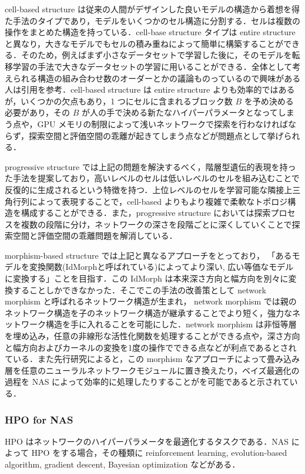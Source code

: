 \documentclass[twocolumn]{ujarticle}   %
\begin{document}
	 cell-based structure は従来の人間がデザインした良いモデルの構造から着想を得た手法のタイプであり，モデルをいくつかのセル構造に分割する．セルは複数の操作をまとめた構造を持っている．cell-base structure タイプは entire structure と異なり，大きなモデルでもセルの積み重ねによって簡単に構築することができる．そのため，例えばまず小さなデータセットで学習した後に，そのモデルを転移学習の手法で大きなデータセットの学習に用いることができる．全体として考えられる構造の組み合わせ数のオーダーとかの議論ものっているので興味がある人は引用を参考．cell-based structure は entire structure よりも効率的ではあるが，いくつかの欠点もあり，1 つにセルに含まれるブロック数 $B$ を予め決める必要があり，その $B$ が人の手で決める新たなハイパーパラメータとなってしまう点や，GPU メモリの制限によって浅いネットワークで探索を行わなければならず，探索空間と評価空間の乖離が起きてしまう点などが問題点として挙げられる．

	 progressive structure では上記の問題を解決するべく，階層型遺伝的表現を持った手法を提案しており，高いレベルのセルは低いレベルのセルを組み込むことで反復的に生成されるという特徴を持つ．上位レベルのセルを学習可能な隣接上三角行列によって表現することで，cell-based よりもより複雑で柔軟なトポロジ構造を構成することができる．また，progressive structure においては探索プロセスを複数の段階に分け，ネットワークの深さを段階ごとに深くしていくことで探索空間と評価空間の乖離問題を解消している．

	 morphism-based structure では上記と異なるアプローチをとっており， 「あるモデルを変換関数(IdMorphと呼ばれている)によってより深い, 広い等価なモデルに変換する」ことを目指す．この IdMorph は本来深さ方向と幅方向を別々に変換することしかできなかった．そこでこの手法の改善策として network morphism と呼ばれるネットワーク構造が生まれ， network morphism では親のネットワーク構造を子のネットワーク構造が継承することでより短く，強力なネットワーク構造を手に入れることを可能にした．network morphism は非恒等層を埋め込み，任意の非線形な活性化関数を処理することができる点や，深さ方向と幅方向およびカーネルの変換を1度の操作でできる点などが利点であるとされている．また先行研究によると，この morphism なアプローチによって畳み込み層を任意のニューラルネットワークモジュールに置き換えたり，ベイズ最適化の過程を NAS によって効率的に処理したりすることがを可能であると示されている．

	\subsubsection{HPO for NAS}
	HPO はネットワークのハイパーパラメータを最適化するタスクである．NAS によって HPO をする場合，その種類に reinforcement learning, evolution-based algorithm, gradient descent, Bayesian optimization などがある．
\end{document}
